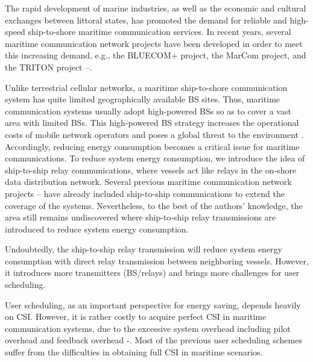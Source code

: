 \documentclass[conference]{IEEEtran}
\begin{document}
 The rapid development of marine industries, as well as the economic and cultural exchanges between littoral states, has promoted the demand for reliable and high-speed ship-to-shore maritime communication services. In recent years, several maritime communication network projects have been developed in order to meet this increasing demand, e.g., the BLUECOM+ project, the MarCom project, and the TRITON project \cite{p321}--\cite{p32}. 
 
 Unlike terrestrial cellular networks, a maritime ship-to-shore communication system has quite limited geographically available BS sites. Thus, maritime communication systems usually adopt high-powered BSs so as to cover a vast area with limited BSs. This high-powered BS strategy increases the operational costs of mobile network operators and poses a global threat to the environment \cite{p33}.
 Accordingly, reducing energy consumption becomes a critical issue for maritime communications. %
 To reduce system energy consumption, we introduce the idea of ship-to-ship relay communications, where vessels act like relays in the on-shore data distribution network. Several previous maritime communication network projects \cite{p321}--\cite{p32} have already included ship-to-ship communications to extend the coverage of the systems. Nevertheless, to the best of the authors' knowledge, the area still remains undiscovered where ship-to-ship relay transmissions are introduced to reduce system energy consumption. 

 Undoubtedly, the ship-to-ship relay transmission will reduce system energy consumption with direct relay transmission between neighboring vessels. 
 However, it introduces more transmitters (BS/relays) and brings more challenges for user scheduling. %

 User scheduling, as an important perspective for energy saving, depends heavily on CSI. However, it is rather costly to acquire perfect CSI in maritime communication systems, due to the excessive system overhead including pilot overhead and feedback overhead \cite{p403}-\cite{p405}. Most of the previous user scheduling schemes suffer from the difficulties in obtaining full CSI in maritime scenarios. 
 
\end{document}
